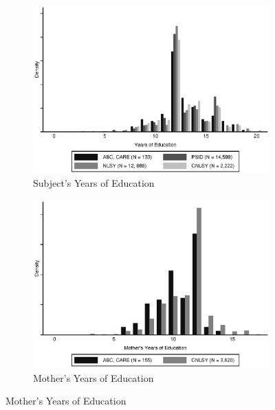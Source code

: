 \begin{figure}[H]
	\ContinuedFloat
	\begin{subfigure}[h]{0.8\textwidth}
	\centering
	\caption{Subject's Years of Education} \label{fig:support_educ}
	\includegraphics[width=\textwidth]{AppOutput/Methodology/support_educ.eps}
	\end{subfigure}
	
	\begin{subfigure}[h]{0.8\textwidth}
	\centering
	\caption{Mother's Years of Education} \label{fig:support_meduc}
	\includegraphics[width=\textwidth]{AppOutput/Methodology/support_momed.eps}
	\end{subfigure}
	
\end{figure}
	
